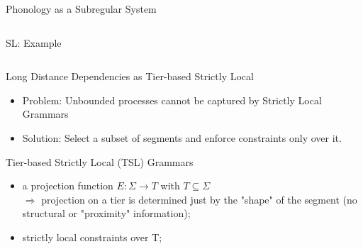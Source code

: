 \documentclass[xcolor={usenames,svgnames,x11names,table}]{beamer}
\begin{document}
\begin{frame}{Phonology as a Subregular System}
\begin{columns}
{\begin{exampleblock}{SL: Example}
\begin{center}
		\end{center}
	\end{exampleblock}
		}
%
	\end{columns}
	\centering
	\vspace{0.3cm}
\end{frame}

\begin{frame}{Long Distance Dependencies as Tier-based Strictly Local}

    \begin{itemize}
    \item Problem: Unbounded processes cannot be captured by Strictly Local Grammars
    \item Solution: Select a subset of segments and enforce constraints only over it.
    \end{itemize}
    
    \begin{block}{Tier-based Strictly Local  (TSL) Grammars}
    	\begin{itemize}
    		\item a projection function $E: \Sigma \rightarrow T$ with $T \subseteq \Sigma$\\
    	$\Rightarrow$ projection on a tier is determined just by the "shape" of the segment (no structural or "proximity" information);
    		\item strictly local constraints over T;
    	\end{itemize}
    \end{block}
\end{frame}
    
\end{document}
